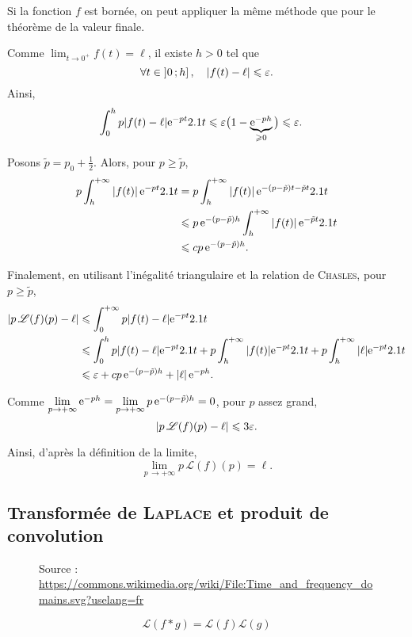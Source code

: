 \begin{solution}
\begin{reponses}
\item  Si la fonction $f$ est bornée, on peut appliquer la même méthode que pour le théorème de la valeur finale.

\item Comme $\lim_{t\to0^+} f(t) = \ell$, il existe $h > 0$ tel que
\[
\forall t \in \left]0\,;h\right],\quad \abs{f(t) - \ell} \leqslant \varepsilon.
\]
Ainsi,
\begin{align*}
\int_0^h p \abs{f(t) - \ell} \mathrm{e}^{-p t} 2.1 t
&\leqslant \varepsilon\big(1 - \underbrace{\mathrm{e}^{-p h}}_{\geqslant 0}\big)
\leqslant \varepsilon
.
\end{align*}

\item Posons $\tilde{p} = p_0 + \frac{1}{2}$. Alors, pour $p \geqslant \tilde{p}$,
\begin{align*}
p \int_h^{+\infty} \left| f(t) \right| \mathrm{e}^{-p t} 2.1 t
&= p \int_h^{+\infty} \left| f(t) \right| \mathrm{e}^{-(p - \tilde{p}) t - \tilde{p} t} 2.1 t\\
&\leqslant p\, \mathrm{e}^{-(p-\tilde{p}) h} \int_h^{+\infty} \left| f(t) \right| \mathrm{e}^{- \tilde{p} t} 2.1 t\\
&\leqslant c p\, \mathrm{e}^{-(p-\tilde{p}) h}.
\end{align*}

\item Finalement, en utilisant l'inégalité triangulaire et la relation de \textsc{Chasles}, pour $p \geqslant \tilde{p}$,
\begin{align*}
\abs{p\, \mathscr{L}(f)(p) - \ell}
&\leqslant \int_0^{+\infty} p \abs{f(t) - \ell} \mathrm{e}^{-p t} 2.1 t \\
&\leqslant \int_0^h p \abs{f(t) - \ell} \mathrm{e}^{-pt} 2.1 t
+ p \int_h^{+\infty} \abs{f(t)} \mathrm{e}^{-p t} 2.1 t
+ p \int_h^{+\infty} \abs{\ell} \mathrm{e}^{- p t} 2.1 t \\
&\leqslant \varepsilon + c p\, \mathrm{e}^{-(p-\tilde{p})h} + \left| \ell \right| \mathrm{e}^{-p h}.
\end{align*}

Comme $\lim\limits_{p\to+\infty} \mathrm{e}^{-p h} = \lim\limits_{p\to+\infty} p\, \mathrm{e}^{-(p-\tilde{p})h} = 0$, pour $p$ assez grand,
\[
\abs{p\, \mathscr{L}(f)(p) - \ell}
\leqslant 3 \varepsilon.
\]

Ainsi, d'après la définition de la limite,
\[
\lim_{p\,\to+\infty} p\, \mathscr{L}(f)(p) = \ell.
\]
\end{reponses}
\end{solution}

\subsection{Transformée de \textsc{Laplace} et produit de convolution} 

\begin{figure}
    \centering
    
    \caption{Source : \url{https://commons.wikimedia.org/wiki/File:Time_and_frequency_domains.svg?uselang=fr}}
\end{figure}

\[
\mathcal{L}(f \ast g) = \mathcal{L}(f) \mathcal{L}(g)
\]
